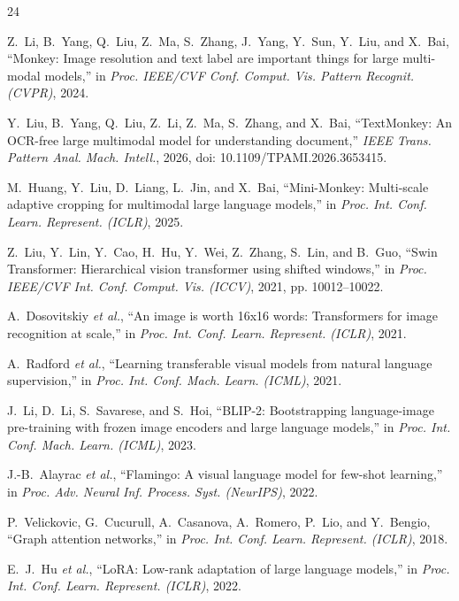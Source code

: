 \documentclass[journal]{IEEEtran}
\begin{document}
\begin{thebibliography}{24}

Z.~Li, B.~Yang, Q.~Liu, Z.~Ma, S.~Zhang, J.~Yang, Y.~Sun, Y.~Liu, and X.~Bai, ``Monkey: Image resolution and text label are important things for large multi-modal models,'' in \emph{Proc. IEEE/CVF Conf. Comput. Vis. Pattern Recognit. (CVPR)}, 2024.

Y.~Liu, B.~Yang, Q.~Liu, Z.~Li, Z.~Ma, S.~Zhang, and X.~Bai, ``TextMonkey: An OCR-free large multimodal model for understanding document,'' \emph{IEEE Trans. Pattern Anal. Mach. Intell.}, 2026, doi: 10.1109/TPAMI.2026.3653415.

M.~Huang, Y.~Liu, D.~Liang, L.~Jin, and X.~Bai, ``Mini-Monkey: Multi-scale adaptive cropping for multimodal large language models,'' in \emph{Proc. Int. Conf. Learn. Represent. (ICLR)}, 2025.

Z.~Liu, Y.~Lin, Y.~Cao, H.~Hu, Y.~Wei, Z.~Zhang, S.~Lin, and B.~Guo, ``Swin Transformer: Hierarchical vision transformer using shifted windows,'' in \emph{Proc. IEEE/CVF Int. Conf. Comput. Vis. (ICCV)}, 2021, pp. 10012--10022.

A.~Dosovitskiy \emph{et al.}, ``An image is worth 16x16 words: Transformers for image recognition at scale,'' in \emph{Proc. Int. Conf. Learn. Represent. (ICLR)}, 2021.

A.~Radford \emph{et al.}, ``Learning transferable visual models from natural language supervision,'' in \emph{Proc. Int. Conf. Mach. Learn. (ICML)}, 2021.

J.~Li, D.~Li, S.~Savarese, and S.~Hoi, ``BLIP-2: Bootstrapping language-image pre-training with frozen image encoders and large language models,'' in \emph{Proc. Int. Conf. Mach. Learn. (ICML)}, 2023.

J.-B.~Alayrac \emph{et al.}, ``Flamingo: A visual language model for few-shot learning,'' in \emph{Proc. Adv. Neural Inf. Process. Syst. (NeurIPS)}, 2022.

P.~Velickovic, G.~Cucurull, A.~Casanova, A.~Romero, P.~Lio, and Y.~Bengio, ``Graph attention networks,'' in \emph{Proc. Int. Conf. Learn. Represent. (ICLR)}, 2018.

E.~J.~Hu \emph{et al.}, ``LoRA: Low-rank adaptation of large language models,'' in \emph{Proc. Int. Conf. Learn. Represent. (ICLR)}, 2022.


\end{thebibliography}
\end{document}
